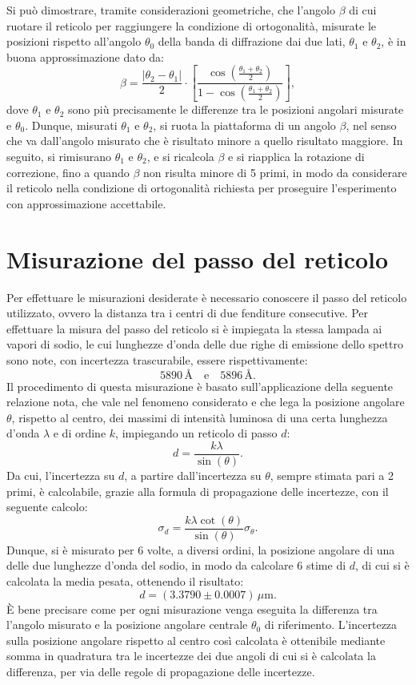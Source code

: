\documentclass[a4paper,12pt]{article}
\begin{document}
Si può dimostrare, tramite considerazioni geometriche, che l’angolo \( \beta \) di cui ruotare il reticolo per raggiungere la condizione di ortogonalità, misurate le posizioni rispetto all’angolo \( \theta_0 \) della banda di diffrazione dai due lati, \( \theta_1 \) e \( \theta_2 \), è in buona approssimazione dato da:
\[
\beta = \frac{|\theta_2 - \theta_1|}{2} \cdot \left[ \frac{\cos\left(\frac{\theta_1 + \theta_2}{2}\right)}{1 - \cos\left(\frac{\theta_1 + \theta_2}{2}\right)} \right],
\]
dove \( \theta_1 \) e \( \theta_2 \) sono più precisamente le differenze tra le posizioni angolari misurate e \( \theta_0 \).
Dunque, misurati \( \theta_1 \) e \( \theta_2 \), si ruota la piattaforma di un angolo \( \beta \), nel senso che va dall’angolo misurato che è risultato minore a quello risultato maggiore. In seguito, si rimisurano \( \theta_1 \) e \( \theta_2 \), e si ricalcola \( \beta \) e si riapplica la rotazione di correzione, fino a quando \( \beta \) non risulta minore di 5 primi, in modo da considerare il reticolo nella condizione di ortogonalità richiesta per proseguire l’esperimento con approssimazione accettabile.

\section{Misurazione del passo del reticolo}
Per effettuare le misurazioni desiderate è necessario conoscere il passo del reticolo utilizzato, ovvero la distanza tra i centri di due fenditure consecutive.
Per effettuare la misura del passo del reticolo si è impiegata la stessa lampada ai vapori di sodio, le cui lunghezze d’onda delle due righe di emissione dello spettro sono note, con incertezza trascurabile, essere rispettivamente:
\[
5890 \, \text{\AA} \quad \text{e} \quad 5896 \, \text{\AA}.
\]
Il procedimento di questa misurazione è basato sull’applicazione della seguente relazione nota, che vale nel fenomeno considerato e che lega la posizione angolare \( \theta \), rispetto al centro, dei massimi di intensità luminosa di una certa lunghezza d’onda \( \lambda \) e di ordine \( k \), impiegando un reticolo di passo \( d \):
\[
d = \frac{k\lambda}{\sin(\theta)}.
\]
Da cui, l’incertezza su \( d \), a partire dall’incertezza su \( \theta \), sempre stimata pari a 2 primi, è calcolabile, grazie alla formula di propagazione delle incertezze, con il seguente calcolo:
\[
\sigma_d = \frac{k\lambda \cot(\theta)}{\sin(\theta)} \sigma_\theta.
\]
Dunque, si è misurato per 6 volte, a diversi ordini, la posizione angolare di una delle due lunghezze d’onda del sodio, in modo da calcolare 6 stime di \( d \), di cui si è calcolata la media pesata, ottenendo il risultato:
\[
d = (3.3790 \pm 0.0007) \, \mu\text{m}.
\]
È bene precisare come per ogni misurazione venga eseguita la differenza tra l’angolo misurato e la posizione angolare centrale \( \theta_0 \) di riferimento. L’incertezza sulla posizione angolare rispetto al centro così calcolata è ottenibile mediante somma in quadratura tra le incertezze dei due angoli di cui si è calcolata la differenza, per via delle regole di propagazione delle incertezze.
\end{document}
